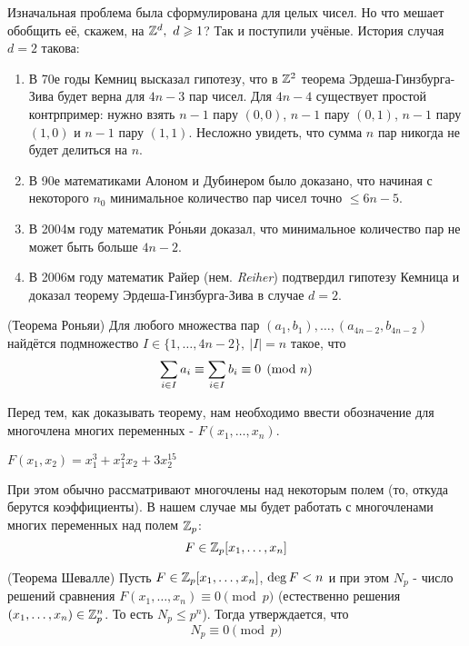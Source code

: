 Изначальная проблема была сформулирована для целых чисел. Но что мешает обобщить её, скажем, на $\mathbb{Z}^d,\ d \geqslant 1$? Так и поступили учёные. История случая $d = 2$ такова:
\begin{enumerate}
	\item В 70е годы Кемниц высказал гипотезу, что в $\mathbb{Z}^2$ теорема Эрдеша-Гинзбурга-Зива будет верна для $4n - 3$ пар чисел. Для $4n - 4$ существует простой контрпример: нужно взять $n - 1$ пару $(0, 0)$, $n - 1$ пару $(0, 1)$, $n - 1$ пару $(1, 0)$ и $n - 1$ пару $(1, 1)$. Несложно увидеть, что сумма $n$ пар никогда не будет делиться на $n$.
	
	\item В 90е математиками Алоном и Дубинером было доказано, что начиная с некоторого $n_0$ минимальное количество пар чисел точно $\le 6n - 5$.
	
	\item В 2004м году математик Р\'{о}ньяи доказал, что минимальное количество пар не может быть больше $4n - 2$.
	
	\item В 2006м году математик Райер (нем. \textit{Reiher}) подтвердил гипотезу Кемница и доказал теорему Эрдеша-Гинзбурга-Зива в случае $d = 2$.
\end{enumerate}

\begin{theorem} (Теорема Роньяи)
	Для любого множества пар $(a_1, b_1), \ldots, (a_{4n - 2}, b_{4n - 2})$ найдётся подмножество $I \in \{1, \ldots, 4n - 2\},\ |I| = n$ такое, что
	\[
		\sum\limits_{i \in I} a_i \equiv \sum\limits_{i \in I} b_i \equiv 0 \pmod n
	\]
\end{theorem}

Перед тем, как доказывать теорему, нам необходимо ввести обозначение для многочлена многих переменных - $F(x_1, \ldots, x_n)$.
\begin{example}
	\(F(x_1, x_2) = x_1^3 + x_1^2 x_2 + 3x_2^{15}\)
\end{example}

При этом обычно рассматривают многочлены над некоторым полем (то, откуда берутся коэффициенты). В нашем случае мы будет работать с многочленами многих переменных над полем $\mathbb{Z}_p$:
\[
	F \in \mathbb{Z}_p[x_1, \ldots, x_n]
\]

\begin{theorem} (Теорема Шевалле)
	Пусть $F \in \mathbb{Z}_p[x_1, \ldots, x_n]$, $\operatorname{deg} F < n$ и при этом $N_p$ - число решений сравнения $F(x_1, \ldots, x_n) \equiv 0 \pmod p$ (естественно решения $(x_1, \ldots, x_n) \in \mathbb{Z}_p^n$. То есть $N_p \le p^n$). Тогда утверждается, что
	\[
		N_p \equiv 0 \pmod p
	\]
\end{theorem}

